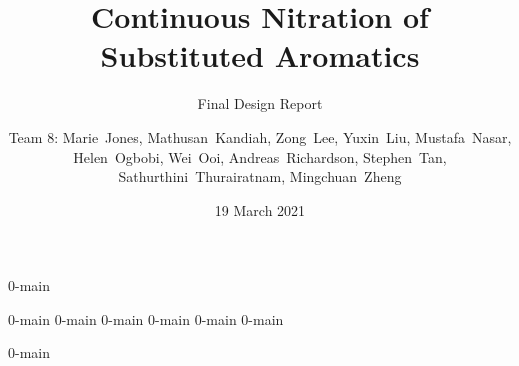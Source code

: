 \documentclass{nitroma-report}
\subtitle{Final Design Report}
\title{Continuous Nitration of Substituted Aromatics}
\author{Team 8: Marie~Jones, Mathusan~Kandiah, Zong~Lee, Yuxin~Liu, Mustafa~Nasar, Helen~Ogbobi, Wei~Ooi, Andreas~Richardson, Stephen~Tan, Sathurthini~Thurairatnam, Mingchuan~Zheng}
\date{19 March 2021}
\begin{document}
\frontmatter
\maketitle

{0-main}

\tableofcontents

\mainmatter
{0-main}
{0-main}
{0-main}
{0-main}
{0-main}
{0-main}

\begin{appendices}
    {0-main}
\end{appendices}
\end{document}
